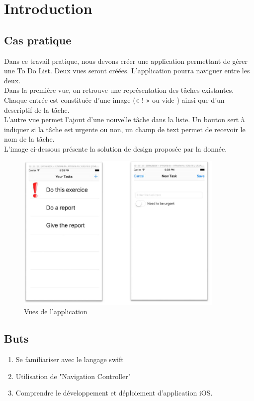 \newpage 
\section{Introduction}
\subsection{Cas pratique}
Dans ce travail pratique, nous devons créer une application permettant de gérer une To Do List. Deux vues seront créées. L'application pourra naviguer entre les deux.\\
Dans la première vue, on retrouve une représentation des tâches
existantes. Chaque entrée est constituée d’une image (« ! » ou vide ) ainsi que d’un descriptif de
la tâche.\\
L'autre vue permet l’ajout d’une nouvelle tâche dans la liste. Un bouton sert à indiquer si la tâche est urgente ou non, un champ de text permet de recevoir le nom de la tâche.\\
L'image ci-dessous présente la solution de design proposée par la donnée.
\begin{figure}[H]
	\begin{center}
		\includegraphics[width=10cm]{img/intro.png}
		\caption{Vues de l'application}
		\label{intro}
	\end{center}
\end{figure}

\subsection{Buts}
\begin{enumerate}
	\item Se familiariser avec le langage swift
	\item Utilisation de "Navigation Controller"
	\item Comprendre le développement et déploiement d'application iOS.
\end{enumerate}

